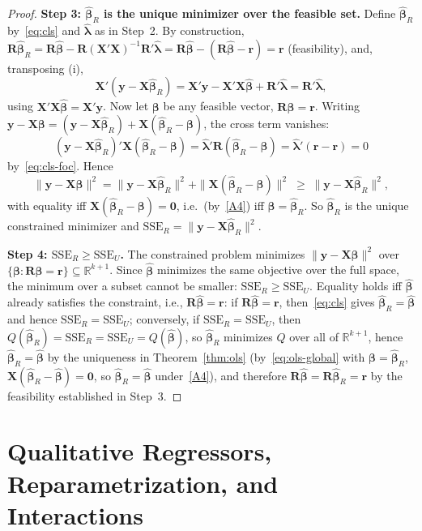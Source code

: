 \documentclass[14pt]{extarticle}
\theoremstyle{plain}
\theoremstyle{definition}
\theoremstyle{remark}
\newcommand{\SSE}{\mathrm{SSE}}
\newcommand{\bX}{\mathbf{X}}
\newcommand{\by}{\mathbf{y}}
\def\bb{\boldsymbol{\beta}}
\newcommand{\bR}{\mathbf{R}}
\newcommand{\br}{\mathbf{r}}
\newcommand{\bzero}{\mathbf{0}}
\newcommand{\Real}{\mathbb{R}}
\begin{document}
\begin{proof}
\textbf{Step 3: $\hat{\bb}_R$ is the unique minimizer over the feasible set.} Define $\hat{\bb}_R$ by~\eqref{eq:cls} and $\hat{\boldsymbol\lambda}$ as in Step~2. By construction, $\bR\hat{\bb}_R = \bR\hat{\bb} - \bR(\bX'\bX)^{-1}\bR'\hat{\boldsymbol\lambda} = \bR\hat{\bb} - (\bR\hat{\bb} - \br) = \br$ (feasibility), and, transposing (i),
\begin{equation}\label{eq:cls-foc}
\bX'(\by - \bX\hat{\bb}_R) = \bX'\by - \bX'\bX\hat{\bb} + \bR'\hat{\boldsymbol\lambda} = \bR'\hat{\boldsymbol\lambda},
\end{equation}
using $\bX'\bX\hat{\bb} = \bX'\by$. Now let $\bb$ be any feasible vector, $\bR\bb = \br$. Writing $\by - \bX\bb = (\by - \bX\hat{\bb}_R) + \bX(\hat{\bb}_R - \bb)$, the cross term vanishes:
\[
(\by - \bX\hat{\bb}_R)'\bX(\hat{\bb}_R - \bb) = \hat{\boldsymbol\lambda}'\bR(\hat{\bb}_R - \bb) = \hat{\boldsymbol\lambda}'(\br - \br) = 0
\]
by~\eqref{eq:cls-foc}. Hence
\[
\|\by - \bX\bb\|^2 = \|\by - \bX\hat{\bb}_R\|^2 + \|\bX(\hat{\bb}_R - \bb)\|^2 \;\geqslant\; \|\by - \bX\hat{\bb}_R\|^2,
\]
with equality iff $\bX(\hat{\bb}_R - \bb) = \bzero$, i.e.\ (by~\ref{A4}) iff $\bb = \hat{\bb}_R$. So $\hat{\bb}_R$ is the unique constrained minimizer and $\SSE_R = \|\by - \bX\hat{\bb}_R\|^2$.

\textbf{Step 4: $\SSE_R \geqslant \SSE_U$.} The constrained problem minimizes $\|\by - \bX\bb\|^2$ over $\{\bb : \bR\bb = \br\} \subseteq \Real^{k+1}$. Since $\hat{\bb}$ minimizes the same objective over the full space, the minimum over a subset cannot be smaller: $\SSE_R \geqslant \SSE_U$. Equality holds iff $\hat{\bb}$ already satisfies the constraint, i.e., $\bR\hat{\bb} = \br$: if $\bR\hat{\bb} = \br$, then~\eqref{eq:cls} gives $\hat{\bb}_R = \hat{\bb}$ and hence $\SSE_R = \SSE_U$; conversely, if $\SSE_R = \SSE_U$, then $Q(\hat{\bb}_R) = \SSE_R = \SSE_U = Q(\hat{\bb})$, so $\hat{\bb}_R$ minimizes $Q$ over all of $\Real^{k+1}$, hence $\hat{\bb}_R = \hat{\bb}$ by the uniqueness in Theorem~\ref{thm:ols} (by~\eqref{eq:ols-global} with $\bb = \hat{\bb}_R$, $\bX(\hat{\bb}_R - \hat{\bb}) = \bzero$, so $\hat{\bb}_R = \hat{\bb}$ under~\ref{A4}), and therefore $\bR\hat{\bb} = \bR\hat{\bb}_R = \br$ by the feasibility established in Step~3.
\end{proof}

\section{Qualitative Regressors, Reparametrization, and Interactions}\label{sec:qual}
\end{document}

